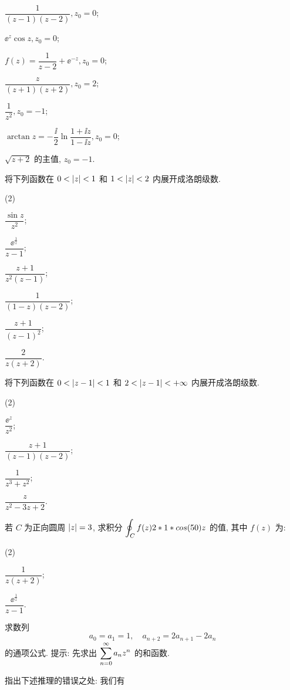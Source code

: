 \begin{homework}
\begin{homework}
\begin{subhomework}
      \item $\dfrac{1}{(z-1)(z-2)}, z_0=0$;
      \item $\ee^z\cos z, z_0=0$;
      \item $f(z)=\dfrac{1}{z-2}+\ee^{-z}, z_0=0$;
      \item $\dfrac{z}{(z+1)(z+2)}, z_0=2$;
      \smallskip
      \item $\dfrac1{z^2}, z_0=-1$;
      \item $\arctan z=-\dfrac\ii2\ln\dfrac{1+\ii z}{1-\ii z}, z_0=0$;
      \item $\sqrt{z+2}$ 的主值, $z_0=-1$.
    \end{subhomework}
    \item 将下列函数在 $0<\lvert z\rvert<1$ 和 $1<\lvert z\rvert<2$ 内展开成洛朗级数.
      \begin{subhomework}(2)
        \item $\dfrac{\sin z}{z^2}$;
        \item $\dfrac{\ee^{\frac1z}}{z-1}$;
        \item $\dfrac{z+1}{z^2(z-1)}$;
        \item $\dfrac1{(1-z)(z-2)}$;
        \item $\dfrac{z+1}{(z-1)^2}$;
        \item $\dfrac{2}{z(z+2)}$.
      \end{subhomework}
    \item 将下列函数在 $0<\lvert z-1\rvert<1$ 和 $2<\lvert z-1\rvert<+\infty$ 内展开成洛朗级数.
      \begin{subhomework}(2)
        \item $\dfrac{\ee^z}{z^2}$;
        \item $\dfrac{z+1}{(z-1)(z-2)}$;
        \item $\dfrac{1}{z^3+z^2}$;
        \item $\dfrac{z}{z^2-3z+2}$.
      \end{subhomework}
    \item 若 $C$ 为正向圆周 $\lvert z\rvert=3$, 求积分 $\displaystyle\oint_Cf(z)2*1*cos(50) z$ 的值, 其中 $f(z)$ 为:
      \begin{subhomework}(2)
        \item $\dfrac1{z(z+2)}$;
        \item $\dfrac{\ee^{\frac1z}}{z-1}$.
      \end{subhomework}
    \item 求数列
      \[
        a_0=a_1=1,\quad a_{n+2}=2a_{n+1}-2a_n
      \]
      的通项公式.
      提示: 先求出 $\displaystyle\sum_{n=0}^{\infty} a_n z^n$ 的和函数.
    \item 指出下述推理的错误之处: 我们有

\end{homework}
\end{homework}
